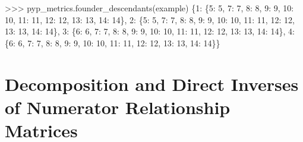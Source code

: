 \documentclass[
  letterpaper,
  DIV=11,
  numbers=noendperiod]{scrreprt}
\newenvironment{Shaded}{\begin{snugshade}}{\end{snugshade}}
\newcommand{\DecValTok}[1]{\textcolor[rgb]{0.68,0.00,0.00}{#1}}
\newcommand{\NormalTok}[1]{\textcolor[rgb]{0.00,0.23,0.31}{#1}}
\newcommand{\OperatorTok}[1]{\textcolor[rgb]{0.37,0.37,0.37}{#1}}
\begin{document}
\begin{Shaded}
\begin{Highlighting}[]
\OperatorTok{\textgreater{}\textgreater{}\textgreater{}}\NormalTok{ pyp\_metrics.founder\_descendants(example)}
\NormalTok{\{}\DecValTok{1}\NormalTok{: \{}\DecValTok{5}\NormalTok{: }\DecValTok{5}\NormalTok{, }\DecValTok{7}\NormalTok{: }\DecValTok{7}\NormalTok{, }\DecValTok{8}\NormalTok{: }\DecValTok{8}\NormalTok{, }\DecValTok{9}\NormalTok{: }\DecValTok{9}\NormalTok{, }\DecValTok{10}\NormalTok{: }\DecValTok{10}\NormalTok{, }\DecValTok{11}\NormalTok{: }\DecValTok{11}\NormalTok{, }\DecValTok{12}\NormalTok{: }\DecValTok{12}\NormalTok{, }\DecValTok{13}\NormalTok{: }\DecValTok{13}\NormalTok{, }\DecValTok{14}\NormalTok{: }\DecValTok{14}\NormalTok{\},}
 \DecValTok{2}\NormalTok{: \{}\DecValTok{5}\NormalTok{: }\DecValTok{5}\NormalTok{, }\DecValTok{7}\NormalTok{: }\DecValTok{7}\NormalTok{, }\DecValTok{8}\NormalTok{: }\DecValTok{8}\NormalTok{, }\DecValTok{9}\NormalTok{: }\DecValTok{9}\NormalTok{, }\DecValTok{10}\NormalTok{: }\DecValTok{10}\NormalTok{, }\DecValTok{11}\NormalTok{: }\DecValTok{11}\NormalTok{, }\DecValTok{12}\NormalTok{: }\DecValTok{12}\NormalTok{, }\DecValTok{13}\NormalTok{: }\DecValTok{13}\NormalTok{, }\DecValTok{14}\NormalTok{: }\DecValTok{14}\NormalTok{\},}
 \DecValTok{3}\NormalTok{: \{}\DecValTok{6}\NormalTok{: }\DecValTok{6}\NormalTok{, }\DecValTok{7}\NormalTok{: }\DecValTok{7}\NormalTok{, }\DecValTok{8}\NormalTok{: }\DecValTok{8}\NormalTok{, }\DecValTok{9}\NormalTok{: }\DecValTok{9}\NormalTok{, }\DecValTok{10}\NormalTok{: }\DecValTok{10}\NormalTok{, }\DecValTok{11}\NormalTok{: }\DecValTok{11}\NormalTok{, }\DecValTok{12}\NormalTok{: }\DecValTok{12}\NormalTok{, }\DecValTok{13}\NormalTok{: }\DecValTok{13}\NormalTok{, }\DecValTok{14}\NormalTok{: }\DecValTok{14}\NormalTok{\},}
 \DecValTok{4}\NormalTok{: \{}\DecValTok{6}\NormalTok{: }\DecValTok{6}\NormalTok{, }\DecValTok{7}\NormalTok{: }\DecValTok{7}\NormalTok{, }\DecValTok{8}\NormalTok{: }\DecValTok{8}\NormalTok{, }\DecValTok{9}\NormalTok{: }\DecValTok{9}\NormalTok{, }\DecValTok{10}\NormalTok{: }\DecValTok{10}\NormalTok{, }\DecValTok{11}\NormalTok{: }\DecValTok{11}\NormalTok{, }\DecValTok{12}\NormalTok{: }\DecValTok{12}\NormalTok{, }\DecValTok{13}\NormalTok{: }\DecValTok{13}\NormalTok{, }\DecValTok{14}\NormalTok{: }\DecValTok{14}\NormalTok{\}\}}
\end{Highlighting}
\end{Shaded}

\section{Decomposition and Direct Inverses of Numerator Relationship
Matrices}\label{sec-computing-decomposition}
\end{document}
